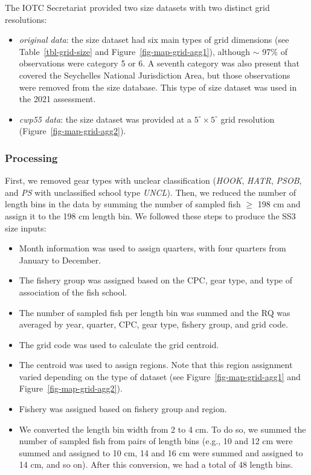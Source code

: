 \documentclass[
]{scrartcl}
\providecommand{\tightlist}{%
  \setlength{\itemsep}{0pt}\setlength{\parskip}{0pt}}\usepackage{longtable,booktabs,array}
\begin{document}
The IOTC Secretariat provided two size datasets with two distinct grid
resolutions:

\begin{itemize}
\tightlist
\item
  \emph{original data}: the size dataset had six main types of grid
  dimensions (see Table~\ref{tbl-grid-size} and
  Figure~\ref{fig-map-grid-agg1}), although \(\sim\) 97\% of
  observations were category 5 or 6. A seventh category was also present
  that covered the Seychelles National Jurisdiction Area, but those
  observations were removed from the size database. This type of size
  dataset was used in the 2021 assessment.
\item
  \emph{cwp55 data}: the size dataset was provided at a
  \(5^\circ\times 5^\circ\) grid resolution
  (Figure~\ref{fig-map-grid-agg2}).
\end{itemize}

\subsubsection{Processing}\label{processing-1}

First, we removed gear types with unclear classification (\emph{HOOK},
\emph{HATR}, \emph{PSOB}, and \emph{PS} with unclassified school type
\emph{UNCL}). Then, we reduced the number of length bins in the data by
summing the number of sampled fish \(\geq\) 198 cm and assign it to the
198 cm length bin. We followed these steps to produce the SS3 size
inputs:

\begin{itemize}
\tightlist
\item
  Month information was used to assign quarters, with four quarters from
  January to December.
\item
  The fishery group was assigned based on the CPC, gear type, and type
  of association of the fish school.
\item
  The number of sampled fish per length bin was summed and the RQ was
  averaged by year, quarter, CPC, gear type, fishery group, and grid
  code.
\item
  The grid code was used to calculate the grid centroid.
\item
  The centroid was used to assign regions. Note that this region
  assignment varied depending on the type of dataset (see
  Figure~\ref{fig-map-grid-agg1} and Figure~\ref{fig-map-grid-agg2}).
\item
  Fishery was assigned based on fishery group and region.
\item
  We converted the length bin width from 2 to 4 cm. To do so, we summed
  the number of sampled fish from pairs of length bins (e.g., 10 and 12
  cm were summed and assigned to 10 cm, 14 and 16 cm were summed and
  assigned to 14 cm, and so on). After this conversion, we had a total
  of 48 length bins.
\end{itemize}
\end{document}
